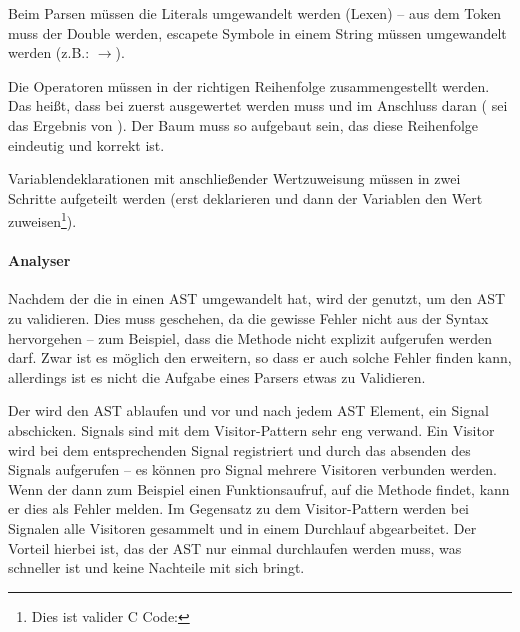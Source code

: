         Beim Parsen müssen die Literals umgewandelt werden (Lexen) -- aus dem Token  muss der Double  werden, escapete Symbole in einem String müssen umgewandelt werden (z.B.: $\rightarrow$).

        Die Operatoren müssen in der richtigen Reihenfolge zusammengestellt werden. Das heißt, dass bei  zuerst  ausgewertet werden muss und im Anschluss daran  ( sei das Ergebnis von ). Der Baum muss so aufgebaut sein, das diese Reihenfolge eindeutig und korrekt ist.

        Variablendeklarationen mit anschließender Wertzuweisung müssen in zwei Schritte aufgeteilt werden (erst deklarieren und dann der Variablen den Wert zuweisen\footnote{
          Dies ist valider C Code: 
        }).

      \paragraph{Analyser}
        Nachdem der  die  in einen AST umgewandelt hat, wird der  genutzt, um den AST zu validieren. Dies muss geschehen, da die gewisse Fehler nicht aus der Syntax hervorgehen -- zum Beispiel, dass die  Methode nicht explizit aufgerufen werden darf. Zwar ist es möglich den  erweitern, so dass er auch solche Fehler finden kann, allerdings ist es nicht die Aufgabe eines Parsers etwas zu Validieren.

        Der  wird den AST ablaufen und vor und nach jedem AST Element, ein Signal abschicken. Signals sind mit dem Visitor-Pattern \autocite[S.366]{Gamma:1995:DPE:186897} sehr eng verwand. Ein Visitor wird bei dem entsprechenden Signal registriert und durch das absenden des Signals aufgerufen -- es können pro Signal mehrere Visitoren verbunden werden. Wenn der  dann zum Beispiel einen Funktionsaufruf, auf die  Methode findet, kann er dies als Fehler melden. Im Gegensatz zu dem Visitor-Pattern werden bei Signalen alle Visitoren gesammelt und in einem Durchlauf abgearbeitet. Der Vorteil hierbei ist, das der AST nur einmal durchlaufen werden muss, was schneller ist und keine Nachteile mit sich bringt.

